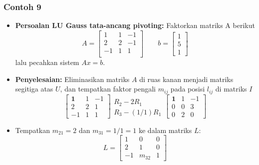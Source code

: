 \documentclass[pdflatex,compress,mathserif]{beamer}
\begin{document}
\begin{frame}
	\frametitle{Contoh 9}
	\begin{itemize}
		\item \textbf{Persoalan LU Gauss tata-ancang pivoting:} Faktorkan matriks A berikut
		\[ A = \begin{bmatrix}
		1 & 1 & -1 \\
		2 & 2 & -1 \\
		-1& 1 & 1 \\
		\end{bmatrix}
		\qquad
		b = \begin{bmatrix}
		1 \\ 5 \\ 1
		\end{bmatrix}
		\]
		lalu pecahkan sistem $ Ax = b $.
	\end{itemize}
\end{frame}

\begin{frame}
	\begin{itemize}
		\item \textbf{Penyelesaian:} Eliminasikan matriks $ A $ di ruas kanan menjadi matriks segitiga atas $ U $, dan tempatkan faktor pengali $ m_{ij} $ pada posisi $ l_{ij} $ di matriks $ I $
		\[ \begin{bmatrix}
			\textbf{1} & 1 & -1 \\
			2 & 2 & 1 \\
			-1 & 1 & 1
		\end{bmatrix}
		\begin{matrix}
		\\ R_2 - 2R_1 \\
		R_3 - (1/1)R_1
		\end{matrix}
		\begin{bmatrix}
		\textbf{1} & 1 & -1 \\
		0 & 0 & 3 \\
		0 & 2 & 0
		\end{bmatrix} \]
		\item Tempatkan $ m_{21} = 2 $ dan $ m_{31} = 1/1 = 1 $ ke dalam matriks $ L $:
		\[ L = \begin{bmatrix}
			1 & 0 & 0 \\
			2 & 1 & 0 \\
			-1 & m_{32} & 1
		\end{bmatrix} \]
	\end{itemize}
\end{frame}
\end{document}

